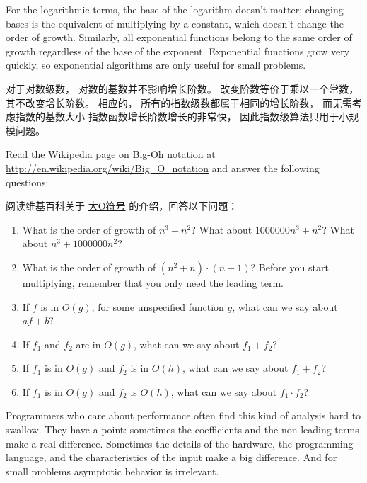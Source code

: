 For the logarithmic terms, the base of the logarithm doesn't matter;
changing bases is the equivalent of multiplying by a constant, which
doesn't change the order of growth.  Similarly, all exponential
functions belong to the same order of growth regardless of the base of
the exponent. Exponential functions grow very quickly, so exponential algorithms are only useful for small problems.

对于对数级数， 对数的基数并不影响增长阶数。
改变阶数等价于乘以一个常数， 其不改变增长阶数。
相应的， 所有的指数级数都属于相同的增长阶数， 而无需考虑指数的基数大小
指数函数增长阶数增长的非常快， 因此指数级算法只用于小规模问题。
  


\begin{exercise}

Read the Wikipedia page on Big-Oh notation at
\url{http://en.wikipedia.org/wiki/Big_O_notation} and
answer the following questions:

阅读维基百科关于 \href{http://en.wikipedia.org/wiki/Big_O_notation}{大O符号} 的介绍，回答以下问题：

\begin{enumerate}
\item What is the order of growth of $n^3 + n^2$?
What about $1000000 n^3 + n^2$?
What about $n^3 + 1000000 n^2$?

\item What is the order of growth of $(n^2 + n) \cdot (n + 1)$?  Before
  you start multiplying, remember that you only need the leading term.

\item If $f$ is in $O(g)$, for some unspecified function $g$, what can
  we say about $af+b$?

\item If $f_1$ and $f_2$ are in $O(g)$, what can we say about $f_1 + f_2$?

\item If  $f_1$ is in $O(g)$
and $f_2$ is in $O(h)$,
what can we say about  $f_1 + f_2$?

\item If  $f_1$ is in $O(g)$ and $f_2$ is $O(h)$,
what can we say about  $f_1 \cdot f_2$?
\end{enumerate}

\end{exercise}

Programmers who care about performance often find this kind of
analysis hard to swallow.  They have a point: sometimes the
coefficients and the non-leading terms make a real difference.
Sometimes the details of the hardware, the programming language, and
the characteristics of the input make a big difference.  And for small
problems asymptotic behavior is irrelevant.

